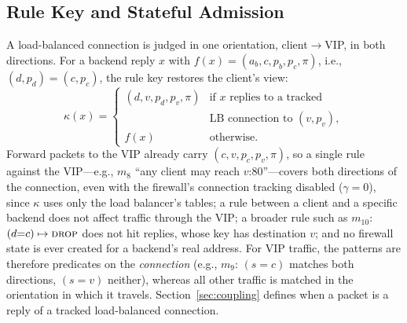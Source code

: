 \documentclass[conference]{IEEEtran}
\begin{document}
\subsection{Rule Key and Stateful Admission}
A load-balanced connection is judged in one orientation, client$\to$VIP, in
both directions. For a backend reply $x$ with $f(x)=(a_b,c,p_b,p_c,\pi)$,
i.e., $(d,p_d)=(c,p_c)$, the rule key restores the client's view:
\begin{equation}
\kappa(x) = \begin{cases}
(d, v, p_d, p_v, \pi) & \text{if $x$ replies to a tracked}\\
 & \text{LB connection to } (v,p_v),\\
f(x) & \text{otherwise}.
\end{cases}
\label{eq:kappa}
\end{equation}
Forward packets to the VIP already carry $(c, v, p_c, p_v, \pi)$, so a single
rule against the VIP---e.g., $m_8$ ``any client may reach $v$:80''---covers
both directions of the connection, even with the firewall's connection
tracking disabled ($\gamma=0$), since $\kappa$ uses only the load balancer's
tables; a rule between a client and a specific backend does not affect traffic through
the VIP; a broader rule such as $m_{10}$: $(d{=}c)\mapsto\textsc{drop}$ does
not hit replies, whose key has destination $v$; and no firewall state is ever
created for a backend's real address. For VIP traffic, the patterns are
therefore predicates on the \emph{connection} (e.g., $m_9$: $(s{=}c)$
matches both directions, $(s{=}v)$ neither), whereas all other traffic is
matched in the orientation in which it travels. Section~\ref{sec:coupling}
defines when a packet is a reply of a tracked load-balanced connection.
\end{document}
